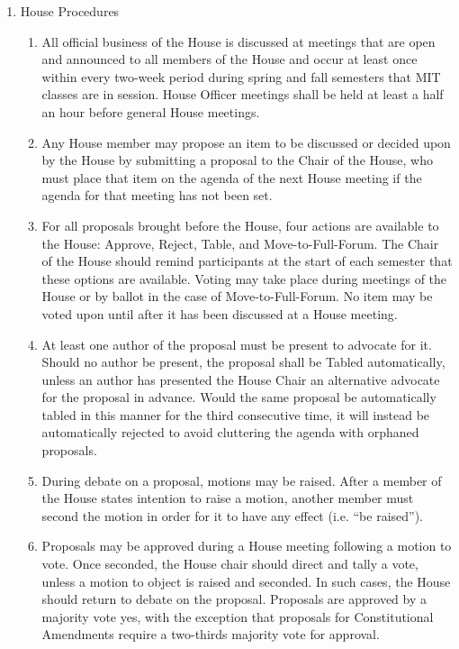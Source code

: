 \documentclass[letterpaper]{article}
\begin{document}
\begin{enumerate}
\begin{enumerate}
\begin{enumerate}
\end{enumerate}

\item House Procedures 

\begin{enumerate}

\item All official business of the House is discussed at meetings that are open and announced to all members of the House and occur at least once within every two-week period during spring and fall semesters that MIT classes are in session. House Officer meetings shall be held at least a half an hour before general House meetings.

\item Any House member may propose an item to be discussed or decided upon by the House by submitting a proposal to the Chair of the House, who must place that item on the agenda of the next House meeting if the agenda for that meeting has not been set.

\item For all proposals brought before the House, four actions are available to the House: Approve, Reject, Table, and Move-to-Full-Forum. The Chair of the House should remind participants at the start of each semester that these options are available. Voting may take place during meetings of the House or by ballot in the case of Move-to-Full-Forum. No item may be voted upon until after it has been discussed at a House meeting.

\item At least one author of the proposal must be present to advocate for it. Should no author be present, the proposal shall be Tabled automatically, unless an author has presented the House Chair an alternative advocate for the proposal in advance. Would the same proposal be automatically tabled in this manner for the third consecutive time, it will instead be automatically rejected to avoid cluttering the agenda with orphaned proposals.

\item During debate on a proposal, motions may be raised. After a member of the House states intention to raise a motion, another member must second the motion in order for it to have any effect (i.e. ``be raised'').

\item Proposals may be approved during a House meeting following a motion to vote. Once seconded, the House chair should direct and tally a vote, unless a motion to object is raised and seconded. In such cases, the House should return to debate on the proposal. Proposals are approved by a majority vote yes, with the exception that proposals for Constitutional Amendments require a two-thirds majority vote for approval.


\end{enumerate}
\end{enumerate}
\end{enumerate}
\end{document}
